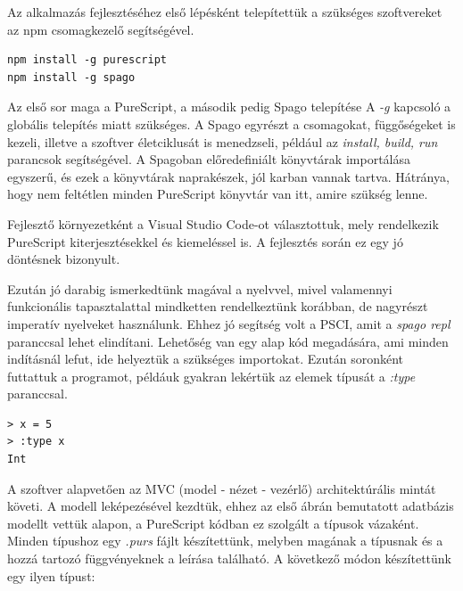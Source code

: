 \documentclass[12pt]{article}
\begin{document}
Az alkalmazás fejlesztéséhez első lépésként telepítettük a szükséges szoftvereket az npm csomagkezelő segítségével. 
\begin{verbatim}
npm install -g purescript
npm install -g spago
\end{verbatim}

Az első sor maga a PureScript, a második pedig Spago telepítése A \textit{-g} kapcsoló a globális telepítés miatt szükséges. A Spago egyrészt a csomagokat, függőségeket is kezeli, illetve a szoftver életciklusát is menedzseli, például az \textit{install, build, run} parancsok segítségével.  A Spagoban előredefiniált könyvtárak importálása egyszerű, és ezek a könyvtárak naprakészek,  jól karban vannak tartva. Hátránya, hogy nem feltétlen minden PureScript könyvtár van itt, amire szükség lenne. 

Fejlesztő környezetként a Visual Studio Code-ot választottuk, mely rendelkezik PureScript kiterjesztésekkel és kiemeléssel is. A fejlesztés során ez egy jó döntésnek bizonyult.

Ezután jó darabig ismerkedtünk magával a nyelvvel, mivel valamennyi funkcionális tapasztalattal mindketten rendelkeztünk korábban, de nagyrészt imperatív nyelveket használunk.  Ehhez jó segítség volt a PSCI, amit a \textit{spago repl} paranccsal lehet elindítani. Lehetőség van egy alap kód megadására, ami minden indításnál lefut, ide helyeztük a szükséges importokat. Ezután soronként futtattuk a programot, példáuk gyakran lekértük az elemek típusát a \textit{:type} paranccsal.

\begin{verbatim}
> x = 5
> :type x
Int
\end{verbatim}

A szoftver alapvetően az MVC (model - nézet - vezérlő) architektúrális mintát követi.  A modell leképezésével kezdtük, ehhez az első ábrán bemutatott adatbázis modellt vettük alapon, a PureScript kódban ez szolgált a típusok vázaként. Minden típushoz egy \textit{.purs} fájlt készítettünk, melyben magának a típusnak és a hozzá tartozó függvényeknek a leírása található. A következő módon készítettünk egy ilyen típust:
\end{document}
